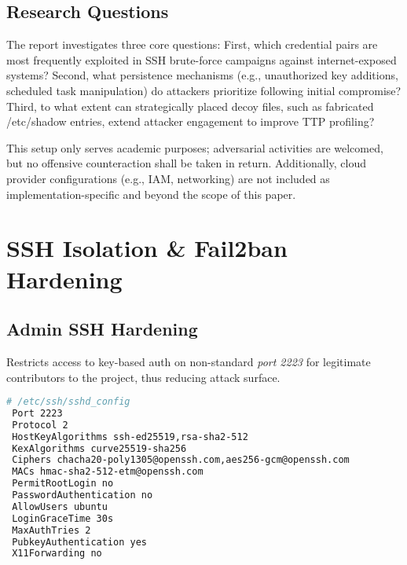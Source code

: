 \documentclass{cls/ULBreport}
\begin{document}
        \subsection{Research Questions}
        The report investigates three core questions: First, which credential pairs are most frequently exploited in SSH brute-force campaigns against internet-exposed systems? Second, what persistence mechanisms (e.g., unauthorized key additions, scheduled task manipulation) do attackers prioritize following initial compromise? Third, to what extent can strategically placed decoy files, such as fabricated /etc/shadow entries, extend attacker engagement to improve TTP profiling?

    \begin{tcolorbox}[  
        colback=red!5!white,  
        colframe=red!75!black,  
        title={\textbf{\textcolor{black}{Security Disclaimer}}},
        fontupper=\small,  
        sharp corners  
    ]  
    This setup only serves academic purposes; adversarial activities are welcomed, but no offensive counteraction shall be taken in return. Additionally, cloud provider configurations (e.g., IAM, networking) are not included as implementation-specific and beyond the scope of this paper.  
    \end{tcolorbox}  

        
    \section{SSH Isolation \& Fail2ban Hardening}

        
        \subsection{Admin SSH Hardening}
        Restricts access to key-based auth on non-standard \textit{port 2223} for legitimate contributors to the project, thus reducing attack surface.
        
        \begin{lstlisting}[language=bash,caption={Securing Legitimate Access}]
 # /etc/ssh/sshd_config
 Port 2223
 Protocol 2
 HostKeyAlgorithms ssh-ed25519,rsa-sha2-512
 KexAlgorithms curve25519-sha256
 Ciphers chacha20-poly1305@openssh.com,aes256-gcm@openssh.com
 MACs hmac-sha2-512-etm@openssh.com
 PermitRootLogin no
 PasswordAuthentication no
 AllowUsers ubuntu
 LoginGraceTime 30s
 MaxAuthTries 2
 PubkeyAuthentication yes
 X11Forwarding no
        \end{lstlisting}
        
\end{document}
